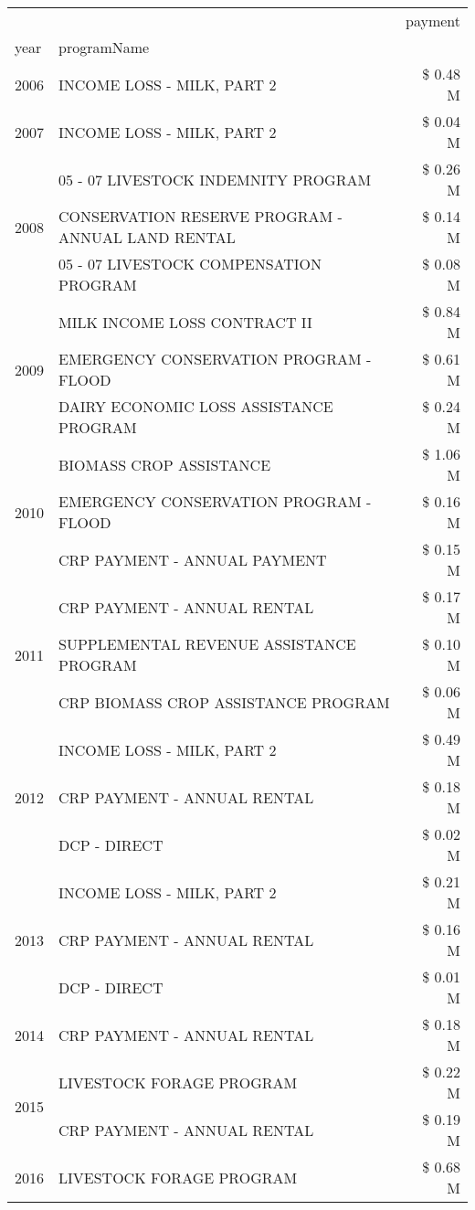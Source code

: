 \begin{tabular}{llr}
\toprule
 &  & payment \\
year & programName &  \\
\midrule
2006 & INCOME LOSS - MILK, PART 2 & \$ 0.48 M \\
\cline{1-3}
2007 & INCOME LOSS - MILK, PART 2 & \$ 0.04 M \\
\cline{1-3}
\multirow[t]{3}{*}{2008} & 05 - 07 LIVESTOCK INDEMNITY PROGRAM & \$ 0.26 M \\
 & CONSERVATION RESERVE PROGRAM - ANNUAL LAND RENTAL & \$ 0.14 M \\
 & 05 - 07 LIVESTOCK COMPENSATION PROGRAM & \$ 0.08 M \\
\cline{1-3}
\multirow[t]{3}{*}{2009} & MILK INCOME LOSS CONTRACT II & \$ 0.84 M \\
 & EMERGENCY CONSERVATION PROGRAM - FLOOD & \$ 0.61 M \\
 & DAIRY ECONOMIC LOSS ASSISTANCE PROGRAM & \$ 0.24 M \\
\cline{1-3}
\multirow[t]{3}{*}{2010} & BIOMASS CROP ASSISTANCE & \$ 1.06 M \\
 & EMERGENCY CONSERVATION PROGRAM - FLOOD & \$ 0.16 M \\
 & CRP PAYMENT - ANNUAL PAYMENT & \$ 0.15 M \\
\cline{1-3}
\multirow[t]{3}{*}{2011} & CRP PAYMENT - ANNUAL RENTAL & \$ 0.17 M \\
 & SUPPLEMENTAL REVENUE ASSISTANCE PROGRAM & \$ 0.10 M \\
 & CRP BIOMASS CROP ASSISTANCE PROGRAM & \$ 0.06 M \\
\cline{1-3}
\multirow[t]{3}{*}{2012} & INCOME LOSS - MILK, PART 2 & \$ 0.49 M \\
 & CRP PAYMENT - ANNUAL RENTAL & \$ 0.18 M \\
 & DCP - DIRECT & \$ 0.02 M \\
\cline{1-3}
\multirow[t]{3}{*}{2013} & INCOME LOSS - MILK, PART 2 & \$ 0.21 M \\
 & CRP PAYMENT - ANNUAL RENTAL & \$ 0.16 M \\
 & DCP - DIRECT & \$ 0.01 M \\
\cline{1-3}
2014 & CRP PAYMENT - ANNUAL RENTAL & \$ 0.18 M \\
\cline{1-3}
\multirow[t]{2}{*}{2015} & LIVESTOCK FORAGE PROGRAM & \$ 0.22 M \\
 & CRP PAYMENT - ANNUAL RENTAL & \$ 0.19 M \\
\cline{1-3}
\multirow[t]{3}{*}{2016} & LIVESTOCK FORAGE PROGRAM & \$ 0.68 M \\

\end{tabular}
